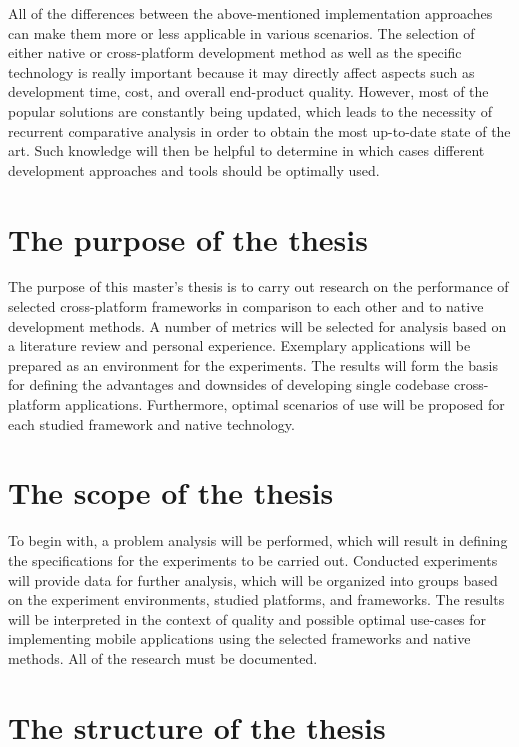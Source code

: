 All of the differences between the above-mentioned implementation approaches can make them more or less applicable in various scenarios. The selection of either native or cross-platform development method as well as the specific technology is really important because it may directly affect aspects such as development time, cost, and overall end-product quality. However, most of the popular solutions are constantly being updated, which leads to the necessity of recurrent comparative analysis in order to obtain the most up-to-date state of the art. Such knowledge will then be helpful to determine in which cases different development approaches and tools should be optimally used.

\section{The purpose of the thesis}

The purpose of this master's thesis is to carry out research on the performance of selected cross-platform frameworks in comparison to each other and to native development methods. A number of metrics will be selected for analysis based on a literature review and personal experience. Exemplary applications will be prepared as an environment for the experiments. The results will form the basis for defining the advantages and downsides of developing single codebase cross-platform applications. Furthermore, optimal scenarios of use will be proposed for each studied framework and native technology.

\section{The scope of the thesis}

To begin with, a problem analysis will be performed, which will result in defining the specifications for the experiments to be carried out. Conducted experiments will provide data for further analysis, which will be organized into groups based on the experiment environments, studied platforms, and frameworks. The results will be interpreted in the context of quality and possible optimal use-cases for implementing mobile applications using the selected frameworks and native methods. All of the research must be documented.

\section{The structure of the thesis}

